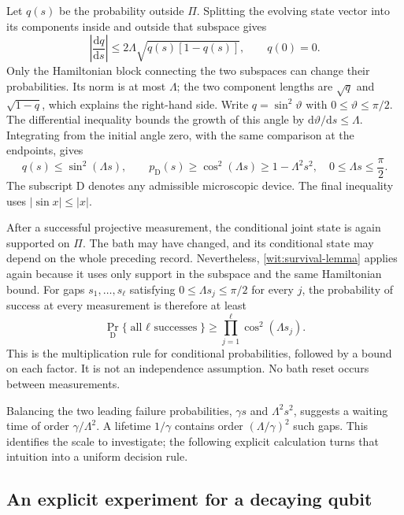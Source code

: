 \documentclass[11pt,a4paper]{article}
\numberwithin{equation}{section}
\theoremstyle{remark}
\newcommand{\dd}{\mathrm d}
\begin{document}
Let $q(s)$ be the probability outside $\Pi$. Splitting the evolving
state vector into its components inside and outside that subspace gives
\begin{equation}
 \left|\frac{\dd q}{\dd s}\right|
 \leq 2\Lambda\sqrt{q(s)[1-q(s)]},
 \qquad q(0)=0.
 \label{wit:leakage-speed}
\end{equation}
Only the Hamiltonian block connecting the two subspaces can change their
probabilities. Its norm is at most $\Lambda$; the two component lengths
are $\sqrt{q}$ and $\sqrt{1-q}$, which explains the right-hand
side. Write $q=\sin^2\vartheta$ with $0\leq\vartheta\leq\pi/2$.
The differential inequality bounds the growth of this angle by
$\dd\vartheta/\dd s\leq\Lambda$. Integrating from the initial angle zero,
with the same comparison at the endpoints, gives
\begin{equation}
 q(s)\leq\sin^2(\Lambda s),\qquad
 p_{\mathrm D}(s)\geq\cos^2(\Lambda s)
 \geq1-\Lambda^2s^2,
 \quad 0\leq\Lambda s\leq\frac\pi2.
 \label{wit:survival-lemma}
\end{equation}
The subscript $\mathrm D$ denotes any admissible microscopic device.
The final inequality uses $|\sin x|\leq |x|$.

After a successful projective measurement, the conditional joint state is
again supported on $\Pi$. The bath may have changed, and its conditional
state may depend on the whole preceding record. Nevertheless,
\eqref{wit:survival-lemma} applies again because it uses only support in
the subspace and the same Hamiltonian bound. For gaps $s_1,\ldots,s_\ell$
satisfying $0\le\Lambda s_j\le\pi/2$ for every $j$,
the probability of success at every measurement is therefore at least
\begin{equation}
 \Pr_{\mathrm D}\{\text{all $\ell$ successes}\}
 \geq\prod_{j=1}^{\ell}\cos^2(\Lambda s_j).
 \label{wit:conditional-product}
\end{equation}
This is the multiplication rule for conditional probabilities, followed
by a bound on each factor. It is not an independence assumption. No bath
reset occurs between measurements.

Balancing the two leading failure probabilities,
$\gamma s$ and $\Lambda^2s^2$, suggests a waiting time of order
$\gamma/\Lambda^2$. A lifetime $1/\gamma$ contains order
$(\Lambda/\gamma)^2$ such gaps. This identifies the scale to investigate;
the following explicit calculation turns that intuition into a uniform
decision rule.

\subsection{An explicit experiment for a decaying qubit}
\end{document}
